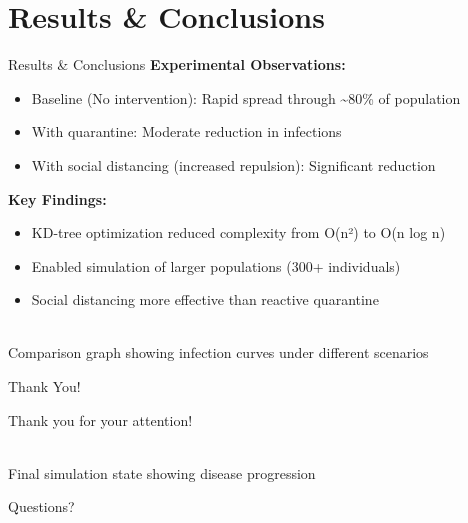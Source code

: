 \documentclass{beamer}
\begin{document}
\section{Results \& Conclusions}
\begin{frame}{Results \& Conclusions}
\textbf{Experimental Observations:}
\begin{itemize}
    \item Baseline (No intervention): Rapid spread through \textasciitilde80\% of population
    \item With quarantine: Moderate reduction in infections
    \item With social distancing (increased repulsion): Significant reduction
\end{itemize}

\vspace{0.3cm}
\textbf{Key Findings:}
\begin{itemize}
    \item KD-tree optimization reduced complexity from O(n²) to O(n log n)
    \item Enabled simulation of larger populations (300+ individuals)
    \item Social distancing more effective than reactive quarantine
\end{itemize}

\begin{center}
    \\
    \small{Comparison graph showing infection curves under different scenarios}
\end{center}
\end{frame}

\begin{frame}{Thank You!}
\begin{center}
    \Large{Thank you for your attention!}
    
    \vspace{0.8cm}
    \\
    \small{Final simulation state showing disease progression}

    \vspace{0.8cm}
    \normalsize{Questions?}
\end{center}
\end{frame}
\end{document}
